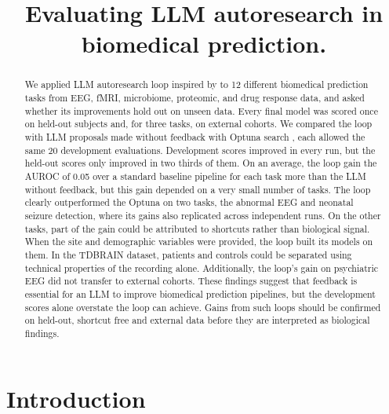 \documentclass[11pt]{article}
\title{Evaluating LLM autoresearch in biomedical prediction.}
\author{}
\date{}
\begin{document}
\maketitle

\begin{abstract}
We applied LLM autoresearch loop inspired by \citet{karpathy_autoresearch} \citep{autoepi} to 12 different biomedical prediction tasks from EEG, fMRI, microbiome, proteomic, and drug response data, and asked whether its improvements hold out 
on unseen data. Every final model was scored once on held-out subjects and, for three tasks, on external cohorts. We compared the loop with LLM proposals made without feedback with Optuna search \citep{akiba2019optuna}, each allowed the same 20 development evaluations. 
Development scores improved in every run, but the held-out scores only improved in two thirds of them. On an average, the loop gain the AUROC of 0.05 over a standard baseline pipeline for each task more than the LLM without feedback, but this gain depended on 
a very small number of tasks. The loop clearly outperformed the Optuna on two tasks, the abnormal EEG and neonatal seizure detection, where its gains also replicated across independent runs. On the other tasks, part of the gain could be attributed to shortcuts rather than biological signal. 
When the site and demographic variables were provided, the loop built its models on them. In the TDBRAIN dataset, patients and controls could be separated using technical properties of the recording alone. Additionally, the loop's gain on psychiatric EEG did not transfer to external cohorts. These findings suggest that feedback is essential for an LLM to improve biomedical prediction pipelines, but the development scores alone overstate the loop can achieve. Gains from such loops should be confirmed on held-out, shortcut free and external data 
before they are interpreted as biological findings.
\end{abstract}
\section{Introduction}\label{sec:intro}
\end{document}
